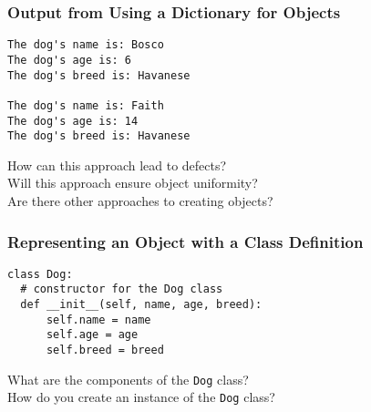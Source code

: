 \documentclass[14pt,aspectratio=169]{beamer}
\begin{document}
%
\begin{frame}[fragile]
  \frametitle{Output from Using a Dictionary for Objects}
  \begin{minipage}{6in}
    \vspace*{.15in}
    \begin{verbatim}
The dog's name is: Bosco
The dog's age is: 6
The dog's breed is: Havanese

The dog's name is: Faith
The dog's age is: 14
The dog's breed is: Havanese
    \end{verbatim}
  \end{minipage}
  \vspace*{.05in}
  \begin{center}
    \normalsize \noindent How can this approach lead to defects? \\
    \normalsize \noindent Will this approach ensure object uniformity? \\
    \normalsize \noindent Are there other approaches to creating objects? \\
  \end{center}
\end{frame}

%
\begin{frame}[fragile]
  \frametitle{Representing an Object with a Class Definition}
  \hspace*{-.1in}
  \begin{minipage}{6in}
    \vspace*{.2in}
    \begin{verbatim}
class Dog:
  # constructor for the Dog class
  def __init__(self, name, age, breed):
      self.name = name
      self.age = age
      self.breed = breed
    \end{verbatim}
  \end{minipage}
  \vspace*{.1in}
  \begin{center}
    \normalsize \noindent What are the components of the {\tt Dog} class? \\
    \normalsize \noindent How do you create an instance of the {\tt Dog} class? \\
  \end{center}
\end{frame}
\end{document}
